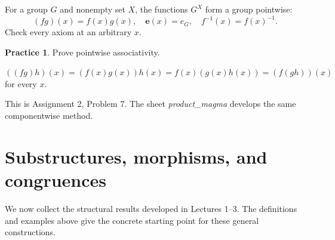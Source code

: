 \documentclass[11pt,openany]{book}
\theoremstyle{definition}
\newtheorem{exercise}[theorem]{Practice}
\begin{document}
For a group $G$ and nonempty set $X$, the functions $G^X$ form a group pointwise:
\[
(fg)(x)=f(x)g(x),\quad \mathbf e(x)=e_G,\quad f^{-1}(x)=f(x)^{-1}.
\]
Check every axiom at an arbitrary $x$.
\begin{exercise}Prove pointwise associativity.\end{exercise}
\begin{solution}$((fg)h)(x)=(f(x)g(x))h(x)=f(x)(g(x)h(x))=(f(gh))(x)$ for every $x$.\end{solution}
\begin{assignmentlink}This is Assignment 2, Problem 7. The sheet \emph{product\_magma} develops the same componentwise method.\end{assignmentlink}


\chapter{Substructures, morphisms, and congruences}
We now collect the structural results developed in Lectures 1--3. The definitions and examples above give the concrete starting point for these general constructions.
\end{document}
